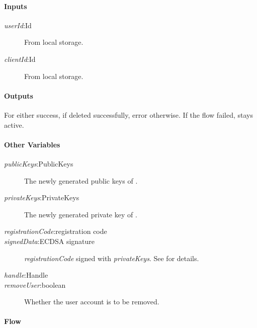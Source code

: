 \documentclass[a4paper,10pt,draft]{article}
\newcommand{\signedData}{\emph{signedData}}
\newcommand{\handle}{\emph{handle}}
\newcommand{\registrationCode}{\emph{registrationCode}}
\newcommand{\privateKeys}{\emph{privateKeys}}
\newcommand{\publicKeys}{\emph{publicKeys}}
\newcommand{\userId}{\emph{userId}}
\newcommand{\clientId}{\emph{clientId}}
\newcommand{\removeUser}{\emph{removeUser}}
\begin{document}
\paragraph{Inputs}
\SpecialItem
\begin{description}
 \item[\userId{}:Id] From \Client{} local storage.
 \item[\clientId{}:Id] From \Client{} local storage.
\end{description}

\paragraph{Outputs}
For \Client{} either success, if \Server{} deleted \Client{} successfully, 
error otherwise. If the flow failed, \Client{} stays active.

\paragraph{Other Variables}
\SpecialItem
\begin{description}
 \item[\publicKeys{}:PublicKeys] The newly generated public keys of 
\Client{}. 
 \item[\privateKeys{}:PrivateKeys] The newly generated private key of
\Client{}.
 \item[\registrationCode{}:registration code]
 \item[\signedData{}:ECDSA signature] \registrationCode{} signed with
\privateKeys{}. See \cite{crypto_spec} for details.
 \item[\handle{}:Handle]
 \item[\removeUser:boolean] Whether the user account is to be removed.
\end{description}

\paragraph{Flow}
\end{document}
